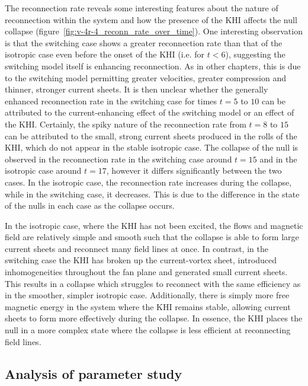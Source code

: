 The reconnection rate reveals some interesting features about the nature of reconnection within the system and how the presence of the KHI affects the null collapse (figure~\ref{fig:v-4r-4_reconn_rate_over_time}). One interesting observation is that the switching case shows a greater reconnection rate than that of the isotropic case even before the onset of the KHI (i.e. for $t < 6$), suggesting the switching model itself is enhancing reconnection. As in other chapters, this is due to the switching model permitting greater velocities, greater compression and thinner, stronger current sheets. It is then unclear whether the generally enhanced reconnection rate in the switching case for times $t=5$ to $10$ can be attributed to the current-enhancing effect of the switching model or an effect of the KHI. Certainly, the spiky nature of the reconnection rate from $t=8$ to $15$ can be attributed to the small, strong current sheets produced in the rolls of the KHI, which do not appear in the stable isotropic case. The collapse of the null is observed in the reconnection rate in the switching case around $t=15$ and in the isotropic case around $t=17$, however it differs significantly between the two cases. In the isotropic case, the reconnection rate increases during the collapse, while in the switching case, it decreases. This is due to the difference in the state of the nulls in each case as the collapse occurs.

In the isotropic case, where the KHI has not been excited, the flows and magnetic field are relatively simple and smooth such that the collapse is able to form large current sheets and reconnect many field lines at once. In contrast, in the switching case the KHI has broken up the current-vortex sheet, introduced inhomogeneities throughout the fan plane and generated small current sheets. This results in a collapse which struggles to reconnect with the same efficiency as in the smoother, simpler isotropic case. Additionally, there is simply more free magnetic energy in the system where the KHI remains stable, allowing current sheets to form more effectively during the collapse. In essence, the KHI places the null in a more complex state where the collapse is less efficient at reconnecting field lines.

\subsection{Analysis of parameter study}

